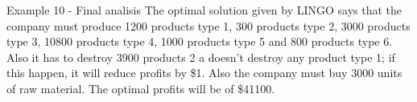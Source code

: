 \begin{frame}{Example 10 - Final analisis}
The optimal solution given by LINGO says that the company must produce 1200 products type 1,
300 products type 2, 3000 products type 3, 10800 products type 4, 1000 products type 5 and
800 products type 6. Also it has to destroy 3900 products 2 a doesn't destroy any product type 1;
if this happen, it will reduce profits by \$1. Also the company must buy 3000 units of raw material.
The optimal profits will be of \$41100.
\end{frame}
